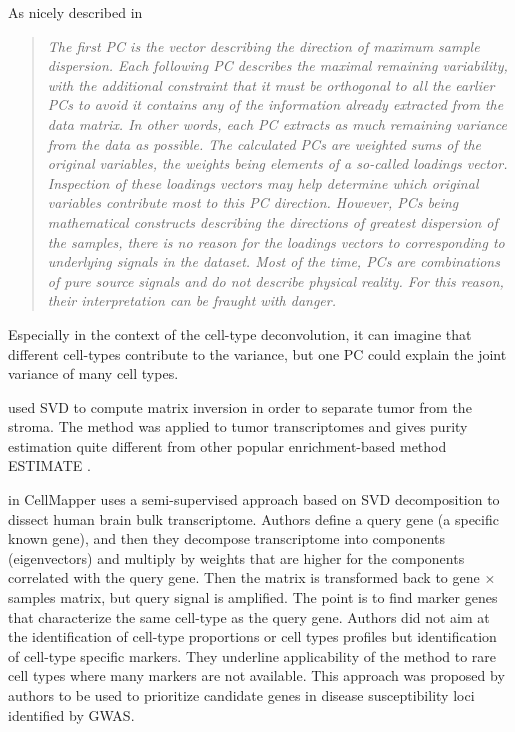 \documentclass[12pt,]{book}
\theoremstyle{definition}
\theoremstyle{definition}
\theoremstyle{definition}
\theoremstyle{remark}
\begin{document}
As nicely described in \citep{Rutledge2013}

\begin{quote}
\emph{The first PC is the vector describing the direction of maximum
sample dispersion. Each following PC describes the maximal remaining
variability, with the additional constraint that it must be orthogonal
to all the earlier PCs to avoid it contains any of the information
already extracted from the data matrix. In other words, each PC extracts
as much remaining variance from the data as possible. The calculated PCs
are weighted sums of the original variables, the weights being elements
of a so-called loadings vector. Inspection of these loadings vectors may
help determine which original variables contribute most to this PC
direction. However, PCs being mathematical constructs describing the
directions of greatest dispersion of the samples, there is no reason for
the loadings vectors to corresponding to underlying signals in the
dataset. Most of the time, PCs are combinations of pure source signals
and do not describe physical reality. For this reason, their
interpretation can be fraught with danger.}
\end{quote}

Especially in the context of the cell-type deconvolution, it can imagine
that different cell-types contribute to the variance, but one PC could
explain the joint variance of many cell types.

\citet{Wang2015} used SVD to compute matrix inversion in order to
separate tumor from the stroma. The method was applied to tumor
transcriptomes and gives purity estimation quite different from other
popular enrichment-based method ESTIMATE \citep{Yoshihara2013}.

\citet{Nelms2016} in CellMapper uses a semi-supervised approach based on
SVD decomposition to dissect human brain bulk transcriptome. Authors
define a query gene (a specific known gene), and then they decompose
transcriptome into components (eigenvectors) and multiply by weights
that are higher for the components correlated with the query gene. Then
the matrix is transformed back to gene \(\times\) samples matrix, but
query signal is amplified. The point is to find marker genes that
characterize the same cell-type as the query gene. Authors did not aim
at the identification of cell-type proportions or cell types profiles
but identification of cell-type specific markers. They underline
applicability of the method to rare cell types where many markers are
not available. This approach was proposed by authors to be used to
prioritize candidate genes in disease susceptibility loci identified by
GWAS.
\end{document}
